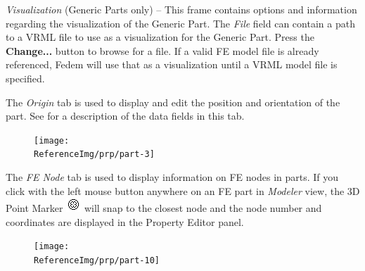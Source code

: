 \begin{bulletlist}

\item{\sl Visualization} {(Generic Parts only) --
  This frame contains options and information regarding the visualization
  of the Generic Part. The {\sl File} field can contain a path to a VRML file to
  use as a visualization for the Generic Part. Press the \textbf{Change...}
  button to browse for a file. If a valid FE model file is already referenced,
  Fedem will use that as a visualization until a VRML model file is specified.}
\end{bulletlist}



The {\sl Origin} tab is used to display and edit the position and
orientation of the part. See 
for a description of the data fields in this tab.

\begin{figure}[H]
  \texttt{[image: \\ReferenceImg/prp/part-3]}
\end{figure}


\clearpage
{}

The {\sl FE Node} tab is used to display information on FE nodes in
parts. If you click with the left mouse button anywhere on an FE part in
{\sl Modeler} view, the 3D Point Marker
\includegraphics[scale=0.7]{Figures/3d_point_marker}
will snap to the closest node and the node number and coordinates are
displayed in the Property Editor panel.

\begin{figure}[H]
  \texttt{[image: \\ReferenceImg/prp/part-10]}
\end{figure}



